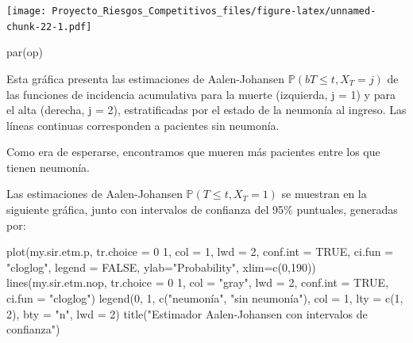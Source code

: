 \documentclass[
]{article}
\newenvironment{Shaded}{\begin{snugshade}}{\end{snugshade}}
\newcommand{\AttributeTok}[1]{\textcolor[rgb]{0.77,0.63,0.00}{#1}}
\newcommand{\ConstantTok}[1]{\textcolor[rgb]{0.00,0.00,0.00}{#1}}
\newcommand{\DecValTok}[1]{\textcolor[rgb]{0.00,0.00,0.81}{#1}}
\newcommand{\FunctionTok}[1]{\textcolor[rgb]{0.00,0.00,0.00}{#1}}
\newcommand{\NormalTok}[1]{#1}
\newcommand{\StringTok}[1]{\textcolor[rgb]{0.31,0.60,0.02}{#1}}
\begin{document}
\texttt{[image: Proyecto\_Riesgos\_Competitivos\_files/figure-latex/unnamed-chunk-22-1.pdf]}

\begin{Shaded}
\begin{Highlighting}[]
\FunctionTok{par}\NormalTok{(op)}
\end{Highlighting}
\end{Shaded}

Esta gráfica presenta las estimaciones de Aalen-Johansen
\(\mathbb{P}( b T ≤ t, X_{T} = j)\) de las funciones de incidencia
acumulativa para la muerte (izquierda, j = 1) y para el alta (derecha, j
= 2), estratificadas por el estado de la neumonía al ingreso. Las líneas
continuas corresponden a pacientes sin neumonía.

Como era de esperarse, encontramos que mueren más pacientes entre los
que tienen neumonía.

Las estimaciones de Aalen-Johansen \(\mathbb{P}( T ≤ t, X_{T} = 1)\) se
muestran en la siguiente gráfica, junto con intervalos de confianza del
95\% puntuales, generadas por:

\begin{Shaded}
\begin{Highlighting}[]
\FunctionTok{plot}\NormalTok{(my.sir.etm.p, }\AttributeTok{tr.choice =} \StringTok{\textquotesingle{}0 1\textquotesingle{}}\NormalTok{, }\AttributeTok{col =} \DecValTok{1}\NormalTok{, }\AttributeTok{lwd =} \DecValTok{2}\NormalTok{, }\AttributeTok{conf.int =} \ConstantTok{TRUE}\NormalTok{, }\AttributeTok{ci.fun =} \StringTok{"cloglog"}\NormalTok{, }\AttributeTok{legend =} \ConstantTok{FALSE}\NormalTok{, }\AttributeTok{ylab=}\StringTok{"Probability"}\NormalTok{, }\AttributeTok{xlim=}\FunctionTok{c}\NormalTok{(}\DecValTok{0}\NormalTok{,}\DecValTok{190}\NormalTok{))}
\FunctionTok{lines}\NormalTok{(my.sir.etm.nop, }\AttributeTok{tr.choice =} \StringTok{\textquotesingle{}0 1\textquotesingle{}}\NormalTok{, }\AttributeTok{col =} \StringTok{"gray"}\NormalTok{, }\AttributeTok{lwd =} \DecValTok{2}\NormalTok{, }\AttributeTok{conf.int =} \ConstantTok{TRUE}\NormalTok{, }\AttributeTok{ci.fun =} \StringTok{"cloglog"}\NormalTok{)}
\FunctionTok{legend}\NormalTok{(}\DecValTok{0}\NormalTok{, }\DecValTok{1}\NormalTok{, }\FunctionTok{c}\NormalTok{(}\StringTok{"neumonía"}\NormalTok{, }\StringTok{"sin neumonía"}\NormalTok{), }\AttributeTok{col =} \DecValTok{1}\NormalTok{, }\AttributeTok{lty =} \FunctionTok{c}\NormalTok{(}\DecValTok{1}\NormalTok{, }\DecValTok{2}\NormalTok{), }\AttributeTok{bty =} \StringTok{"n"}\NormalTok{, }\AttributeTok{lwd =} \DecValTok{2}\NormalTok{)}
\FunctionTok{title}\NormalTok{(}\StringTok{"Estimador Aalen{-}Johansen con intervalos de confianza"}\NormalTok{)}
\end{Highlighting}
\end{Shaded}
\end{document}

